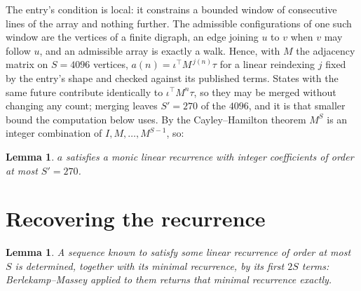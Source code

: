\documentclass[11pt,a4paper]{article}
\theoremstyle{plain}
\newtheorem{lemma}[theorem]{Lemma}
\theoremstyle{definition}
\begin{document}
The entry's condition is local: it constrains a bounded window of consecutive lines of the
array and nothing further. The admissible configurations of one such window are the vertices
of a finite digraph, an edge joining $u$ to $v$ when $v$ may follow $u$, and an admissible
array is exactly a walk. Hence, with $M$ the adjacency matrix on $S=4096$ vertices,
$a(n)=\iota^{\!\top}M^{\,j(n)}\tau$ for a linear reindexing $j$ fixed by the entry's shape
and checked against its published terms. States with the same future contribute identically to $\iota^{\!\top}M^n\tau$, so they may be merged without changing any count; merging leaves $S'=270$ of the $4096$, and it is that smaller bound the computation below uses. By the Cayley--Hamilton theorem $M^{S}$ is an
integer combination of $I,M,\dots,M^{S-1}$, so:

\begin{lemma}\label{lem:cf}
$a$ satisfies a monic linear recurrence with integer coefficients of order at most
$S'=270$.
\end{lemma}

\section{Recovering the recurrence}

\begin{lemma}\label{lem:bm}
A sequence known to satisfy some linear recurrence of order at most $S$ is determined, together
with its minimal recurrence, by its first $2S$ terms: Berlekamp--Massey applied to them returns
that minimal recurrence exactly.
\end{lemma}
\end{document}
